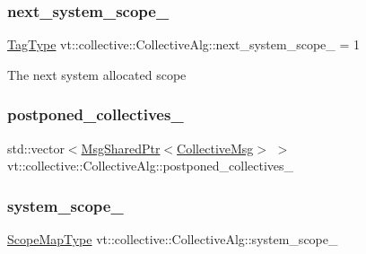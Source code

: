\subsubsection{\texorpdfstring{next\+\_\+system\+\_\+scope\+\_\+}{next\_system\_scope\_}}
{\footnotesize\ttfamily \hyperlink{namespacevt_a84ab281dae04a52a4b243d6bf62d0e52}{Tag\+Type} vt\+::collective\+::\+Collective\+Alg\+::next\+\_\+system\+\_\+scope\+\_\+ = 1\hspace{0.3cm}{\ttfamily [private]}}

The next system allocated scope \mbox{\label{structvt_1_1collective_1_1_collective_alg_ac6db64bfd14e19d0a31f69a349a452c5}} 
\subsubsection{\texorpdfstring{postponed\+\_\+collectives\+\_\+}{postponed\_collectives\_}}
{\footnotesize\ttfamily std\+::vector$<$\hyperlink{namespacevt_ab2b3d506ec8e8d1540aede826d84a239}{Msg\+Shared\+Ptr}$<$\hyperlink{structvt_1_1collective_1_1_collective_alg_1_1_collective_msg}{Collective\+Msg}$>$ $>$ vt\+::collective\+::\+Collective\+Alg\+::postponed\+\_\+collectives\+\_\+\hspace{0.3cm}{\ttfamily [private]}}

\mbox{\label{structvt_1_1collective_1_1_collective_alg_a947ce4f129e1cf626da031595fe5df5c}} 
\subsubsection{\texorpdfstring{system\+\_\+scope\+\_\+}{system\_scope\_}}
{\footnotesize\ttfamily \hyperlink{structvt_1_1collective_1_1_collective_alg_abf644b20fe35cf654f5d4a6702ef5183}{Scope\+Map\+Type} vt\+::collective\+::\+Collective\+Alg\+::system\+\_\+scope\+\_\+\hspace{0.3cm}{\ttfamily [private]}}

